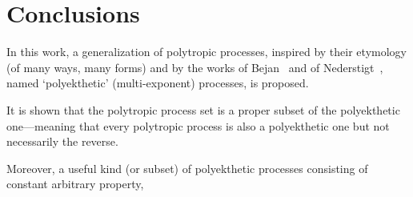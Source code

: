 \section{Conclusions}

    In this work, a generalization of polytropic processes, inspired by their etymology (of many
    ways,  many  forms)  and   by   the   works   of   Bejan~\cite{2006-BejanA-Wiley}   and   of
    Nederstigt~\cite{2017-NederstigtP-TUDelft}, named `polyekthetic' (multi-exponent) processes,
    is proposed.

    It is shown that the  polytropic  process  set  is  a  proper  subset  of  the  polyekthetic
    one---meaning that every polytropic process is also a polyekthetic one but  not  necessarily
    the reverse.

    Moreover, a useful kind (or subset) of polyekthetic processes consisting of constant
    arbitrary property, 


